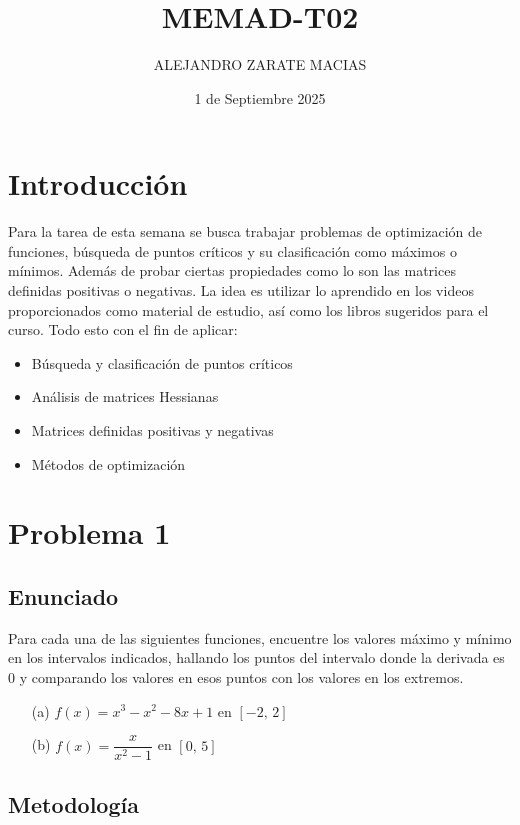 \documentclass{article}
\title{MEMAD-T02}
\author{ALEJANDRO ZARATE MACIAS}
\date{1 de Septiembre 2025}
\begin{document}
\maketitle

\section*{Introducción}

Para la tarea de esta semana se busca trabajar problemas de optimización de funciones, búsqueda de puntos críticos y su clasificación como máximos o mínimos. Además de probar ciertas propiedades como lo son las matrices definidas positivas o negativas.
La idea es utilizar lo aprendido en los videos proporcionados como material de estudio, así como los libros sugeridos para el curso. Todo esto con el fin de aplicar:
\begin{itemize}
    \item Búsqueda y clasificación de puntos críticos
    \item Análisis de matrices Hessianas
    \item Matrices definidas positivas y negativas
    \item Métodos de optimización
\end{itemize}

\section{Problema 1}

\subsection{Enunciado}
Para cada una de las siguientes funciones, encuentre los valores máximo y mínimo en los intervalos indicados, hallando los puntos del intervalo donde la derivada es $0$ y comparando los valores en esos puntos con los valores en los extremos.

\begin{enumerate}
  \item[(a)] $f(x) = x^{3} - x^{2} - 8x + 1$ en $[-2,\,2]$
  \item[(b)] $f(x) = \dfrac{x}{x^{2}-1}$ en $[0,\,5]$
\end{enumerate}

\subsection{Metodología}
\end{document}
